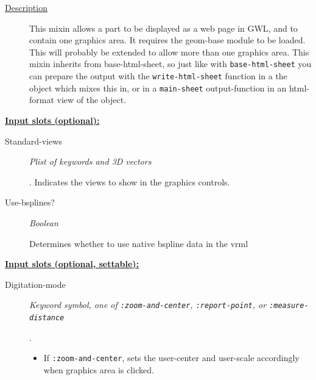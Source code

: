 \documentclass [11pt]{book}
\begin{document}
\begin{itemize}
\begin{description}
\item [
\underline{Description}]


This mixin allows a part to be displayed as a web page in GWL, and
to contain one graphics area. It requires the geom-base module to be loaded. This will 
probably be extended to allow more than one graphics area. This mixin inherits from 
base-html-sheet, so just like with \texttt{base-html-sheet} you can prepare the output 
with the \texttt{write-html-sheet} function  in a the object which mixes  this in, or 
in a \texttt{main-sheet} output-function in an html-format view of the object.






\end{description}








\textbf{
\underline{Input slots (optional):}}

\begin{description}

\item [Standard-views]
\emph{Plist of keywords and 3D vectors}

.
Indicates the views to show in the graphics controls.




\item [Use-bsplines?]
\emph{Boolean}

 Determines whether to use native bspline data in the vrml




\end{description}






\textbf{
\underline{Input slots (optional, settable):}}

\begin{description}

\item [Digitation-mode]
\emph{Keyword symbol, one of \texttt{:zoom-and-center}, \texttt{:report-point}, or \texttt{:measure-distance}}

.


\begin{itemize}

\item If \texttt{:zoom-and-center}, sets the user-center and user-scale accordingly when graphics
area is clicked.



\end{itemize}
\end{description}
\end{itemize}
\end{document}
